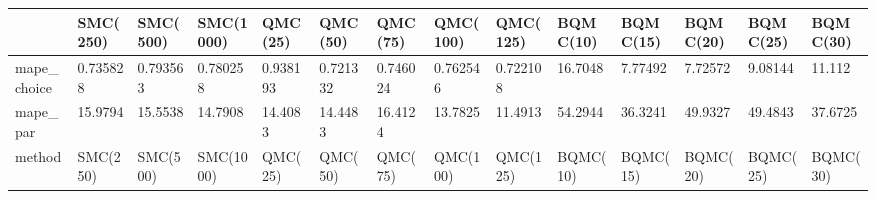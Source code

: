 \begin{tabular}{llllllllllllll}
\toprule
{} &                                           SMC(250) &                                           SMC(500) &                                          SMC(1000) &                                            QMC(25) &                                            QMC(50) &                                            QMC(75) &                                           QMC(100) &                                           QMC(125) &                                           BQMC(10) &                                           BQMC(15) &                                           BQMC(20) &                                           BQMC(25) &                                           BQMC(30) \\
\midrule
mape\_choice &                                           0.735828 &                                           0.793563 &                                           0.780258 &                                           0.938193 &                                           0.721332 &                                           0.746024 &                                           0.762546 &                                           0.722108 &                                            16.7048 &                                            7.77492 &                                            7.72572 &                                            9.08144 &                                             11.112 \\
mape\_par    &                                            15.9794 &                                            15.5538 &                                            14.7908 &                                            14.4083 &                                            14.4483 &                                            16.4124 &                                            13.7825 &                                            11.4913 &                                            54.2944 &                                            36.3241 &                                            49.9327 &                                            49.4843 &                                            37.6725 \\
method      &                                           SMC(250) &                                           SMC(500) &                                          SMC(1000) &                                            QMC(25) &                                            QMC(50) &                                            QMC(75) &                                           QMC(100) &                                           QMC(125) &                                           BQMC(10) &                                           BQMC(15) &                                           BQMC(20) &                                           BQMC(25) &                                           BQMC(30) \\

\end{tabular}
